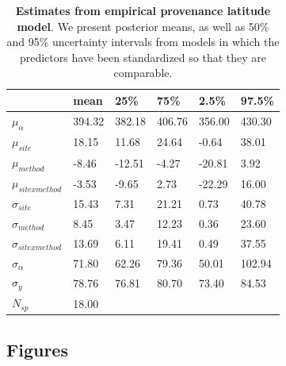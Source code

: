 \documentclass{article}\usepackage[]{graphicx}\usepackage[]{color}
\begin{document}
\begin{table}[ht]
\centering
\caption{\textbf{Estimates from empirical provenance latitude model}. We present posterior means, as well as 50\% and 95\% uncertainty intervals from models in which the predictors have been standardized so that they are comparable.} 
\label{tab:provreal}
\begingroup\footnotesize
\begin{tabular}{|p{}|p{}p{}p{}p{}p{}|}
  \hline
 & mean & 25\% & 75\% & 2.5\% & 97.5\% \\ 
  \hline
$\mu_{\alpha}$ & 394.32 & 382.18 & 406.76 & 356.00 & 430.30 \\ 
  $\mu_{site}$ & 18.15 & 11.68 & 24.64 & -0.64 & 38.01 \\ 
  $\mu_{method}$ & -8.46 & -12.51 & -4.27 & -20.81 & 3.92 \\ 
  $\mu_{sitexmethod}$ & -3.53 & -9.65 & 2.73 & -22.29 & 16.00 \\ 
  $\sigma_{site}$ & 15.43 & 7.31 & 21.21 & 0.73 & 40.78 \\ 
  $\sigma_{method}$ & 8.45 & 3.47 & 12.23 & 0.36 & 23.60 \\ 
  $\sigma_{sitexmethod}$ & 13.69 & 6.11 & 19.41 & 0.49 & 37.55 \\ 
  $\sigma_{\alpha}$ & 71.80 & 62.26 & 79.36 & 50.01 & 102.94 \\ 
  $\sigma_{y}$ & 78.76 & 76.81 & 80.70 & 73.40 & 84.53 \\ 
   \hline
$N_{sp}$ & 18.00 &  &  &  &  \\ 
   \hline
\end{tabular}
\endgroup
\end{table}


\clearpage
\subsection*{Figures}

  
\end{document}
